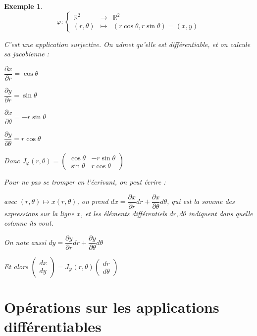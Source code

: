 \documentclass[a4paper,12pt]{book}
\newtheorem{Exe}{Exemple}[section]
\def\R{\mathbb{R}}
\begin{document}
\begin{Exe}
$$\varphi:\left\{\begin{array}{rcl}\R^2 & \to & \R^2 \\ (r,\theta) & \mapsto & (r\cos\theta, r\sin\theta) = (x, y)\end{array}\right.$$
\par C'est une application surjective. On admet qu'elle est différentiable, et on calcule sa jacobienne :
\par $\dfrac{\partial x}{\partial r} = \cos\theta$
\par $\dfrac{\partial y}{\partial r} = \sin\theta$
\par $\dfrac{\partial x}{\partial \theta} =-r\sin\theta$
\par $\dfrac{\partial y}{\partial \theta} =r\cos\theta$
\par Donc $J_\varphi(r, \theta) = \begin{pmatrix} \cos\theta & -r\sin\theta \\ \sin\theta & r\cos\theta \end{pmatrix}$
\par Pour ne pas se tromper en l'écrivant, on peut écrire :
\par avec $(r,\theta)\mapsto x(r, \theta)$, on prend $dx = \dfrac{\partial x}{\partial r}dr + \dfrac{\partial x}{\partial \theta}d\theta$, qui est la somme des expressions sur la ligne $x$, et les éléments différentiels $dr, d\theta$ indiquent dans quelle colonne ils vont.
\par On note aussi $dy = \dfrac{\partial y}{\partial r}dr + \dfrac{\partial y}{\partial \theta}d\theta$
\par Et alors $\begin{pmatrix} dx \\ dy\end{pmatrix} = J_\varphi(r,\theta)\begin{pmatrix}dr \\d\theta\end{pmatrix}$
\end{Exe}


\section{Opérations sur les applications différentiables}
\end{document}
